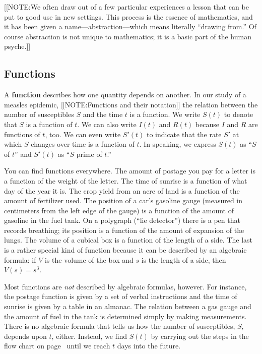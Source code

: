 [[NOTE:We often draw out of a few particular experiences a lesson that
  can be put to good use in new settings.  This process is the essence
  of mathematics, and it has been given a name---abstraction---which
  means literally ``drawing from.'' Of course
  abstraction is not unique to mathematics; it is a basic part of the
  human psyche.]]



\subsection{Functions}
\label{subsec:functions}


A {\bf function} describes how one quantity depends on
another.  In our study of a measles epidemic,
[[NOTE:Functions and  their notation]]
the relation between the number of susceptibles $S$ and the time $t$
is a function.  We write $S(t)$ to denote that $S$ is a function of
$t$.  We can also write $I(t)$ and $R(t)$ because $I$ and $R$ are
functions of $t$, too.  We can even write $S'(t)$ to indicate that the
rate $S'$ at which $S$ changes over time is a function of $t$.  In
speaking, we express $S(t)$ as ``$S$ of $t$'' and $S'(t)$ as ``$S$
prime of $t$.''

You can find functions everywhere.  The amount of postage you pay for
a letter is a function of the weight of the letter.  The time of
sunrise is a function of what day of the year it is.  The crop yield
from an acre of land is a function of the amount of fertilizer used.
The position of a car's gasoline gauge (measured in centimeters from
the left edge of the gauge) is a function of the amount of gasoline in
the fuel tank.  On a polygraph (``lie detector'') there is a pen that
records breathing; its position is a function of the amount of
expansion of the lungs.  The volume of a cubical box is a function of
the length of a side.  The last is a rather special kind of function
because it can be described by an algebraic formula: if $V$ is the
volume of the box and $s$ is the length of a side, then $V(s) = s^3$.

Most functions are {\em not\/} described by algebraic formulas,
however. For instance, the postage function is given by
a set of verbal instructions and the time of sunrise is given by a
table in an almanac.  The relation between a gas gauge and the amount
of fuel in the tank is determined simply by making measurements.
There is no algebraic formula that tells us how the number of
susceptibles, $S$, depends upon $t$, either.  Instead, we find $S(t)$
by carrying out the steps in the flow chart on
page~\pageref{`flowchart'} until we reach $t$ days into the future.

